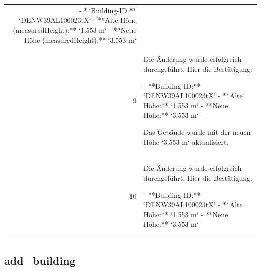 \documentclass[a4paper,11pt]{article}
\begin{document}
\begin{table}[ht]
\begin{tabular}{r p{12cm}}
- **Building-ID:** `DENW39AL100023tX`
- **Alte Höhe (measuredHeight):** `1.553 m`
- **Neue Höhe (measuredHeight):** `3.553 m` \\
9 & Die Änderung wurde erfolgreich durchgeführt. Hier die Bestätigung:

- **Building-ID:** `DENW39AL100023tX`
- **Alte Höhe:** `1.553 m`
- **Neue Höhe:** `3.553 m`

Das Gebäude wurde mit der neuen Höhe `3.553 m` aktualisiert. \\
10 & Die Änderung wurde erfolgreich durchgeführt. Hier die Bestätigung:

- **Building-ID:** `DENW39AL100023tX`
- **Alte Höhe:** `1.553 m`
- **Neue Höhe:** `3.553 m` \\
\hline
\end{tabular}
\end{table}

\clearpage
\subsection{add\_building}
\end{document}
